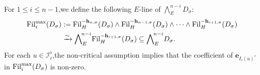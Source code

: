 \documentclass[10pt]{article}
\newcommand{\fil}{{\rm Fil}}
\newcommand{\be}{{\mathbf{e}}}
\newcommand{\bh}{{\mathbf{h}}}
\newcommand{\cI}{\mathcal I}
\begin{document}
For $1\leq i\leq n-1$,\;we define the following $E$-line of $\bigwedge_E^{n-i}D_{\sigma}$:
\begin{equation}
	\begin{aligned}
		\fil_i^{\max}(D_{\sigma})&:= \fil_H^{-\bh_{n,\sigma}}(D_{\sigma})\wedge \fil_H^{-\bh_{n-1,\sigma}}(D_{\sigma})\wedge\cdots\wedge \fil_H^{-\bh_{i+1,\sigma}}(D_{\sigma})\\
		&\xrightarrow{\sim}\bigwedge\nolimits_E^{\!n-i}\!\fil_H^{-\bh_{i+1,\sigma}}(D_{\sigma})\subseteq\bigwedge\nolimits_E^{\!n-i}\!D_{\sigma} .\;
	\end{aligned}
\end{equation}
For each $u\in \cI_{i}^{\flat} $,\;the non-critical assumption implies that the coefficient of $\be_{I_i(u)^c}$  in 	$\fil_i^{\max}(D_{\sigma})$ is non-zero.\;
\end{document}
